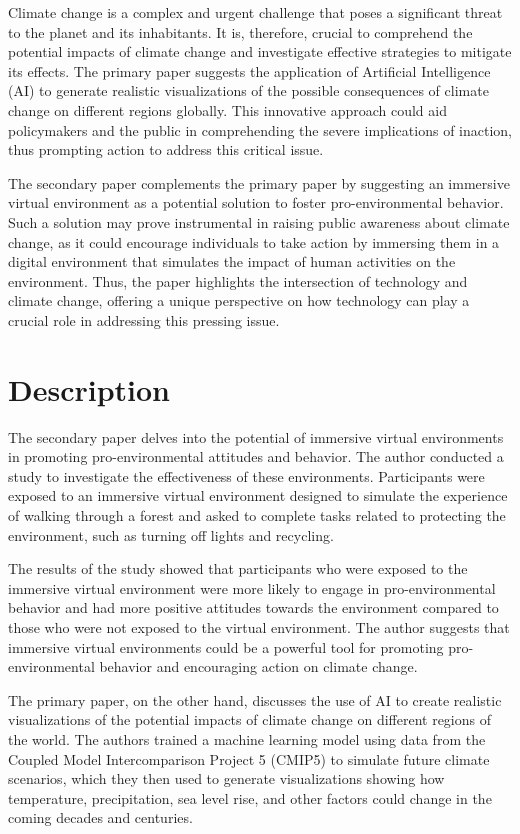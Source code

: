 \documentclass{article}
\begin{document}
Climate change is a complex and urgent challenge that poses a significant threat to the planet and its inhabitants. It is, therefore, crucial to comprehend the potential impacts of climate change and investigate effective strategies to mitigate its effects. The primary paper suggests the application of Artificial Intelligence (AI) to generate realistic visualizations of the possible consequences of climate change on different regions globally. This innovative approach could aid policymakers and the public in comprehending the severe implications of inaction, thus prompting action to address this critical issue.

The secondary paper complements the primary paper by suggesting an immersive virtual environment as a potential solution to foster pro-environmental behavior. Such a solution may prove instrumental in raising public awareness about climate change, as it could encourage individuals to take action by immersing them in a digital environment that simulates the impact of human activities on the environment. Thus, the paper highlights the intersection of technology and climate change, offering a unique perspective on how technology can play a crucial role in addressing this pressing issue.

\section{Description}
The secondary paper delves into the potential of immersive virtual environments in promoting pro-environmental attitudes and behavior. The author conducted a study to investigate the effectiveness of these environments. Participants were exposed to an immersive virtual environment designed to simulate the experience of walking through a forest and asked to complete tasks related to protecting the environment, such as turning off lights and recycling.

The results of the study showed that participants who were exposed to the immersive virtual environment were more likely to engage in pro-environmental behavior and had more positive attitudes towards the environment compared to those who were not exposed to the virtual environment. The author suggests that immersive virtual environments could be a powerful tool for promoting pro-environmental behavior and encouraging action on climate change.

The primary paper, on the other hand, discusses the use of AI to create realistic visualizations of the potential impacts of climate change on different regions of the world. The authors trained a machine learning model using data from the Coupled Model Intercomparison Project 5 (CMIP5) to simulate future climate scenarios, which they then used to generate visualizations showing how temperature, precipitation, sea level rise, and other factors could change in the coming decades and centuries.
\end{document}
